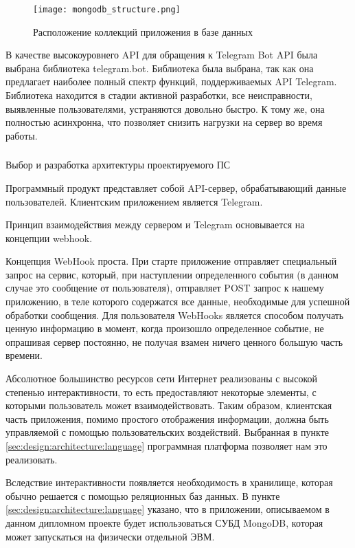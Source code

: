 \begin{figure}[!h]
	\centering
	\texttt{[image: mongodb\_structure.png]} 
	\caption{Расположение коллекций приложения в базе данных}
	\label{fig:analysis:structure:mongo}
\end{figure}

В качестве высокоуровнего API для обращения к Telegram Bot API была выбрана библиотека telegram.bot. Библиотека была выбрана, так как она предлагает наиболее полный спектр функций, поддерживаемых API Telegram. Библиотека находится в стадии активной разработки, все неисправности, выявленные пользователями, устраняются довольно быстро. К тому же, она полностью асинхронна, что позволяет снизить нагрузки на сервер во время работы.

\subsubsection{} Выбор и разработка архитектуры проектируемого ПС
\label{sec:design:architecture:architecture}

Программный продукт представляет собой API-сервер, обрабатывающий
данные пользователей. Клиентским приложением является Telegram.

Принцип взаимодействия между сервером и Telegram основывается на концепции webhook.

Концепция WebHook проста. При старте приложение отправляет специальный запрос на сервис, который, при наступлении определенного события (в данном случае это сообщение от пользователя), отправляет POST запрос к нашему приложению, в теле которого содержатся все данные, необходимые для успешной обработки сообщения. Для пользователя WebHooks является способом получать ценную информацию в момент, когда произошло определенное событие, не опрашивая сервер постоянно, не получая взамен ничего ценного большую часть времени. 

Абсолютное большинство ресурсов сети Интернет реализованы с высокой степенью интерактивности, то есть предоставляют некоторые элементы, с которыми пользователь может взаимодействовать. Таким образом, клиентская часть приложения, помимо простого отображения информации, должна быть управляемой с помощью пользовательских воздействий. Выбранная в пункте \ref{sec:design:architecture:language} программная платформа позволяет нам это реализовать.

Вследствие интерактивности появляется необходимость в хранилище, которая обычно решается с помощью реляционных баз данных. В пункте \ref{sec:design:architecture:language} указано, что в приложении, описываемом в данном дипломном проекте будет использоваться СУБД MongoDB, которая может запускаться на физически отдельной ЭВМ.


